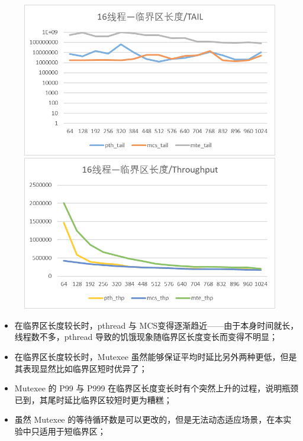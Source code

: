 \documentclass[UTF8]{ctexart}
\begin{document}
\begin{figure}[!h]
    \centering
    \begin{minipage}{0.49\linewidth}
        \centering
        \includegraphics[scale=0.64]{../images/19.png}
    \end{minipage}
    \begin{minipage}{0.49\linewidth}
        \centering
        \includegraphics[scale=0.64]{../images/20.png}
    \end{minipage}
\end{figure}

\newpage

\begin{itemize}
    \item 在临界区长度较长时，pthread 与 MCS变得逐渐趋近——由于本身时间就长，线程数不多，pthread 导致的饥饿现象随临界区长度变长而变得不明显；
    \item 在临界区长度较长时，Mutexee 虽然能够保证平均时延比另外两种更低，但是其表现显然比如临界区短时优异了；
    \item Mutexee 的 P99 与 P999 在临界区长度变长时有个突然上升的过程，说明瓶颈已到，其尾时延比临界区较短时更为糟糕；
    \item 虽然 Mutexee 的等待循环数是可以更改的，但是无法动态适应场景，在本实验中只适用于短临界区；
\end{itemize}
\end{document}
